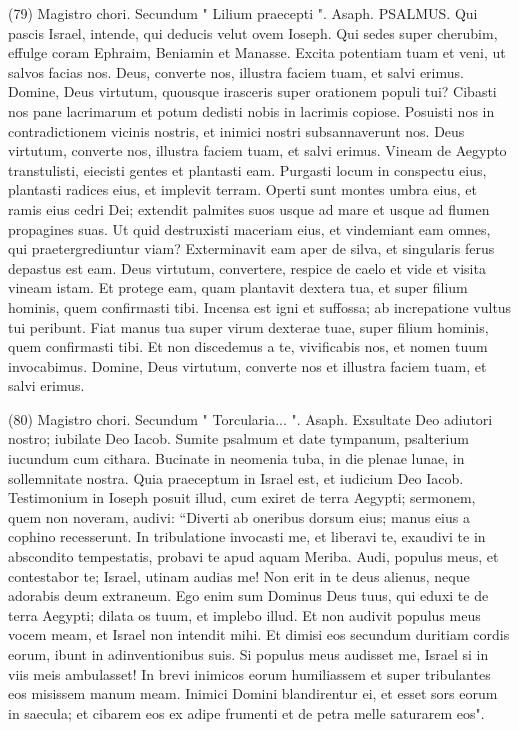\begin{biblechapter}  (79) 
\verse  Magistro chori. Secundum " Lilium praecepti ". Asaph. PSALMUS. 
\verse Qui pascis Israel, intende, qui deducis velut ovem Ioseph. Qui sedes super cherubim, effulge 
\verse coram Ephraim, Beniamin et Manasse. Excita potentiam tuam et veni, ut salvos facias nos. 
\verse Deus, converte nos, illustra faciem tuam, et salvi erimus. 
\verse Domine, Deus virtutum, quousque irasceris super orationem populi tui? 
\verse Cibasti nos pane lacrimarum et potum dedisti nobis in lacrimis copiose. 
\verse Posuisti nos in contradictionem vicinis nostris, et inimici nostri subsannaverunt nos. 
\verse Deus virtutum, converte nos, illustra faciem tuam, et salvi erimus. 
\verse Vineam de Aegypto transtulisti, eiecisti gentes et plantasti eam. 
\verse Purgasti locum in conspectu eius, plantasti radices eius, et implevit terram. 
\verse Operti sunt montes umbra eius, et ramis eius cedri Dei; 
\verse extendit palmites suos usque ad mare et usque ad flumen propagines suas. 
\verse Ut quid destruxisti maceriam eius, et vindemiant eam omnes, qui praetergrediuntur viam? 
\verse Exterminavit eam aper de silva, et singularis ferus depastus est eam. 
\verse Deus virtutum, convertere, respice de caelo et vide et visita vineam istam. 
\verse Et protege eam, quam plantavit dextera tua, et super filium hominis, quem confirmasti tibi. 
\verse Incensa est igni et suffossa; ab increpatione vultus tui peribunt. 
\verse Fiat manus tua super virum dexterae tuae, super filium hominis, quem confirmasti tibi. 
\verse Et non discedemus a te, vivificabis nos, et nomen tuum invocabimus. 
\verse Domine, Deus virtutum, converte nos et illustra faciem tuam, et salvi erimus. 
\end{biblechapter}

\begin{biblechapter}  (80) 
\verse  Magistro chori. Secundum " Torcularia... ". Asaph. 
\verse Exsultate Deo adiutori nostro; iubilate Deo Iacob. 
\verse Sumite psalmum et date tympanum, psalterium iucundum cum cithara. 
\verse Bucinate in neomenia tuba, in die plenae lunae, in sollemnitate nostra. 
\verse Quia praeceptum in Israel est, et iudicium Deo Iacob. 
\verse Testimonium in Ioseph posuit illud, cum exiret de terra Aegypti; sermonem, quem non noveram, audivi: 
\verse “Diverti ab oneribus dorsum eius; manus eius a cophino recesserunt. 
\verse In tribulatione invocasti me, et liberavi te, exaudivi te in abscondito tempestatis, probavi te apud aquam Meriba. 
\verse Audi, populus meus, et contestabor te; Israel, utinam audias me! 
\verse Non erit in te deus alienus, neque adorabis deum extraneum. 
\verse Ego enim sum Dominus Deus tuus, qui eduxi te de terra Aegypti; dilata os tuum, et implebo illud. 
\verse Et non audivit populus meus vocem meam, et Israel non intendit mihi. 
\verse Et dimisi eos secundum duritiam cordis eorum, ibunt in adinventionibus suis. 
\verse Si populus meus audisset me, Israel si in viis meis ambulasset! 
\verse In brevi inimicos eorum humiliassem et super tribulantes eos misissem manum meam. 
\verse Inimici Domini blandirentur ei, et esset sors eorum in saecula; 
\verse et cibarem eos ex adipe frumenti et de petra melle saturarem eos". 
\end{biblechapter}

